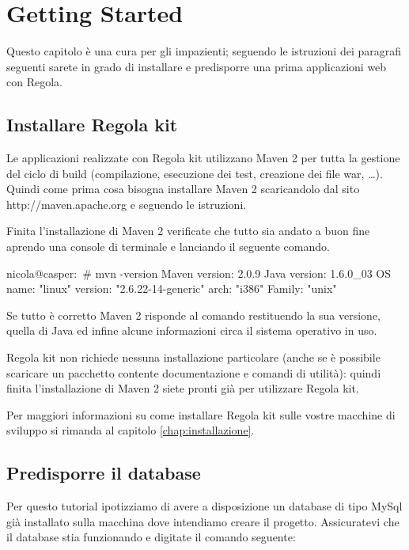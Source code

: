 \chapter{Getting Started}

Questo capitolo è una cura per gli impazienti; seguendo le istruzioni dei paragrafi seguenti sarete in grado di installare e predisporre una prima applicazioni web con Regola.

\section{Installare Regola kit}
Le applicazioni realizzate con Regola kit utilizzano Maven 2 per tutta la gestione del ciclo di build (compilazione, esecuzione dei test, creazione dei file war, \ldots). Quindi come prima cosa bisogna installare Maven 2 
scaricandolo dal sito  {http://maven.apache.org} e seguendo le istruzioni.

Finita l'installazione di Maven 2 verificate che tutto sia andato a buon fine aprendo una console di terminale e lanciando il seguente comando.

\begin{bash}
nicola@casper:~# mvn -version
Maven version: 2.0.9
Java version: 1.6.0_03
OS name: "linux" version: "2.6.22-14-generic" arch: "i386" Family: "unix"
\end{bash}

Se tutto è corretto Maven 2 risponde al comando restituendo la sua versione, quella di Java ed infine alcune informazioni circa il sistema operativo in uso.

Regola kit non richiede nessuna installazione particolare (anche se è possibile scaricare un pacchetto contente documentazione e comandi di utilità): quindi finita l'installazione di Maven 2 siete pronti già per utilizzare Regola kit.


\begin{nota}
Per maggiori informazioni su come installare Regola kit sulle vostre macchine di sviluppo si rimanda al capitolo  \vref{chap:installazione}.
\end{nota}


\section{Predisporre il database}
Per questo tutorial ipotizziamo di avere a disposizione un database di tipo MySql già installato sulla macchina dove intendiamo creare il progetto. Assicuratevi che il database stia funzionando e digitate il comando seguente:

